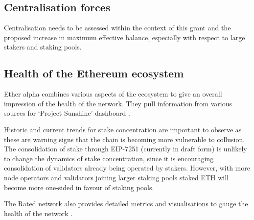 \documentclass{article}
\begin{document}
\subsection{Centralisation forces}
Centralisation needs to be assessed within the context of this grant and the
proposed increase in maximum effective balance, especially with respect to
large stakers and staking pools.


\subsection{Health of the Ethereum ecosystem}
Ether alpha combines various aspects of the ecosystem to give an overall
impression of the health of the network. They pull information from various
sources for `Project Sunshine' dashboard \cite{easunshine}. 

Historic and current trends for stake concentration are important to observe as
these are warning signs that the chain is becoming more vulnerable to
collusion. The consolidation of stake through EIP-7251 (currently in draft
form) \cite{Neuder2023c} is unlikely to change the dynamics of stake
concentration, since it is encouraging consolidation of validators already
being operated by stakers. However, with more node operators and validators
joining larger staking pools staked ETH will become more one-sided in favour of
staking pools. 

The Rated network also provides detailed metrics and visualisations to gauge
the health of the network \cite{Rated2023a}. 

\clearpage
\end{document}
